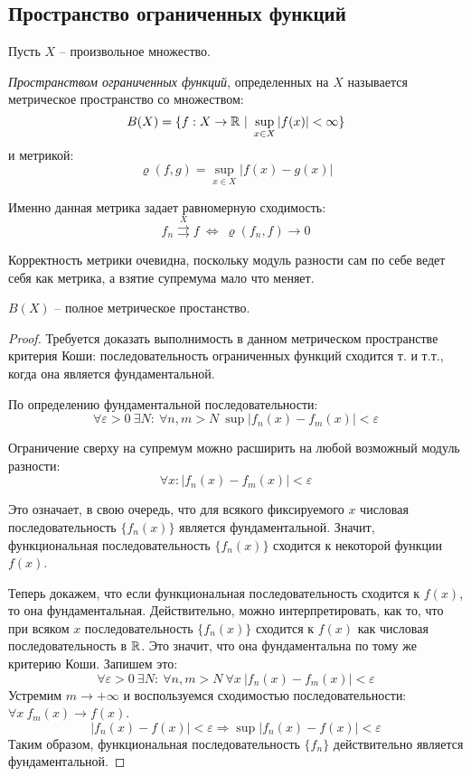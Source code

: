 \documentclass[../main.tex]{subfiles}
\begin{document}
	\subsection{Пространство ограниченных функций}
	Пусть $X$ -- произвольное множество.
	\begin{definition}
		\textit{Пространством ограниченных функций}, определенных на $X$ называется метрическое пространство со множеством:
		\[
		B(X)=
		\{
		f:X\to \R \ | \ 
		\sup\limits_{x\in X}|f(x)| < \infty
		\}
		\]
		и метрикой:
		\[
		\varrho(f, g)=
		\sup\limits_{x\in X}|f(x)-g(x)|
		\]
	\end{definition}

	Именно данная метрика задает равномерную сходимость:
	\[
	f_n\overset{X}{\rightrightarrows} f
	\ \Leftrightarrow \ \varrho(f_n, f)\to 0
	\]
	
	Корректность метрики очевидна, поскольку модуль разности сам по себе ведет себя как метрика, а взятие супремума мало что меняет.
	
	\begin{statement}
		$B(X)$ -- полное метрическое простанство.
	\end{statement}
	\begin{proof}
		Требуется доказать выполнимость в данном метрическом пространстве критерия Коши: последовательность ограниченных функций сходится т. и т.т., когда она является фундаментальной.
		
		По определению фундаментальной последовательности:
		\[
		\forall \varepsilon>0 \ \exists N: \ \forall n, m>N \ \sup|f_n(x)-f_m(x)|<\varepsilon
		\]
		
		Ограничение сверху на супремум можно расширить на любой возможный модуль разности:
		\[
		\forall x: |f_n(x)-f_m(x)|<\varepsilon
		\]
		
		Это означает, в свою очередь, что для всякого фиксируемого $x$ числовая последовательность $\{f_n(x)\}$ является фундаментальной. Значит, функциональная последовательность $\{f_n(x)\}$ сходится к некоторой функции $f(x)$.
		
		Теперь докажем, что если функциональная последовательность сходится к $f(x)$, то она фундаментальная. Действительно,  можно интерпретировать, как то, что при всяком $x$ последовательность $\{f_n(x)\}$ сходится к $f(x)$ как числовая последовательность в $\mathbb{R}$. Это значит, что она фундаментальна по тому же критерию Коши. Запишем это:
		\[
		\forall \varepsilon>0 \ \exists N: \ \forall n, m>N \ \forall x \ |f_n(x)-f_m(x)|<\varepsilon
		\]
		Устремим $m\to+\infty$ и воспользуемся сходимостью последовательности: $\forall x \ f_m(x)\to f(x)$.
		\[
		|f_n(x)-f(x)|<\varepsilon\Rightarrow
		\sup|f_n(x)-f(x)|<\varepsilon
		\]
		Таким образом, функциональная последовательность $\{f_n\}$ действительно является фундаментальной.
	\end{proof}
	
\end{document}
